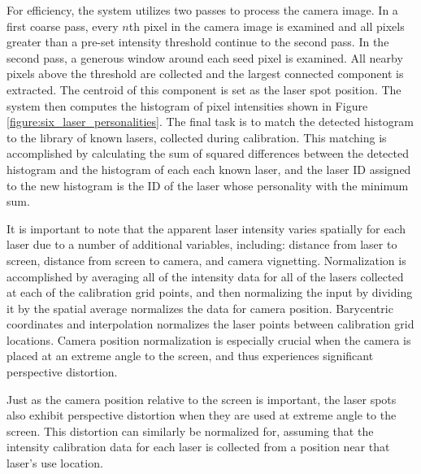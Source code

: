 For efficiency, the system utilizes two passes to process the camera image.  In
a first coarse pass, every $n$th pixel in the camera image is examined
and all pixels greater than a pre-set intensity threshold continue to
the second pass.  In the second pass, a generous window around each
seed pixel is examined.  All nearby pixels above the
threshold are collected and the largest connected component is extracted.  
The centroid of this component is set as the laser spot position.  The system then computes
the histogram of pixel intensities shown in
Figure \ref{figure:six_laser_personalities}.  The final task is to
match the detected histogram to the library of known lasers, collected during calibration.  
This matching is accomplished by calculating the sum of squared differences between
the detected histogram and the histogram of each each known laser, and the laser ID assigned to the new histogram is the ID of the laser whose personality with the minimum sum.

It is important to note that the apparent laser intensity varies
spatially for each laser due to a number of additional variables,
including: distance from laser to screen, distance from screen to
camera, and camera vignetting.  
Normalization is accomplished by 
averaging all of the intensity data for all of the lasers collected
at each of the calibration grid points, and then normalizing the
input by dividing it by the spatial average normalizes the data for camera position.
Barycentric coordinates and interpolation normalizes the laser points 
between calibration grid locations.
Camera position normalization is especially crucial when the camera is placed
at an extreme angle to the screen, and thus experiences significant
perspective distortion.


Just as the camera position relative to the screen is important, the
laser spots also exhibit perspective distortion when they are used at
extreme angle to the screen.  This distortion can similarly be normalized for, assuming that the intensity calibration data for each
laser is collected from a position near that laser's use location.

